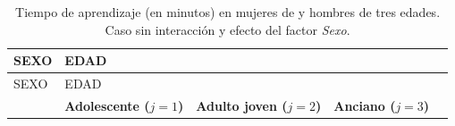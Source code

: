 \documentclass[]{book}
\theoremstyle{definition}
\theoremstyle{definition}
\theoremstyle{definition}
\theoremstyle{remark}
\begin{document}
\begin{longtable}[]{@{}lllll@{}}
\caption{\label{tab:aprendizaje2} Tiempo de aprendizaje (en minutos) en
mujeres de y hombres de tres edades. Caso sin interacción y efecto del
factor \emph{Sexo}.}\tabularnewline
\toprule
\begin{minipage}[b]{0.15\columnwidth}\raggedright
SEXO\strut
\end{minipage} & \begin{minipage}[b]{0.17\columnwidth}\raggedright
EDAD\strut
\end{minipage} & \begin{minipage}[b]{0.17\columnwidth}\raggedright
\strut
\end{minipage} & \begin{minipage}[b]{0.16\columnwidth}\raggedright
\strut
\end{minipage} & \begin{minipage}[b]{0.20\columnwidth}\raggedright
\strut
\end{minipage}\tabularnewline
\midrule
\endfirsthead
\toprule
\begin{minipage}[b]{0.15\columnwidth}\raggedright
SEXO\strut
\end{minipage} & \begin{minipage}[b]{0.17\columnwidth}\raggedright
EDAD\strut
\end{minipage} & \begin{minipage}[b]{0.17\columnwidth}\raggedright
\strut
\end{minipage} & \begin{minipage}[b]{0.16\columnwidth}\raggedright
\strut
\end{minipage} & \begin{minipage}[b]{0.20\columnwidth}\raggedright
\strut
\end{minipage}\tabularnewline
\midrule
\endhead
\begin{minipage}[t]{0.15\columnwidth}\raggedright
\strut
\end{minipage} & \begin{minipage}[t]{0.17\columnwidth}\raggedright
\textbf{Adolescente (\(j = 1\))}\strut
\end{minipage} & \begin{minipage}[t]{0.17\columnwidth}\raggedright
\textbf{Adulto joven (\(j = 2\))}\strut
\end{minipage} & \begin{minipage}[t]{0.16\columnwidth}\raggedright
\textbf{Anciano (\(j = 3\)) }\strut
\end{minipage} & \begin{minipage}[t]{0.20\columnwidth}\raggedright

\end{minipage}
\end{longtable}
\end{document}
